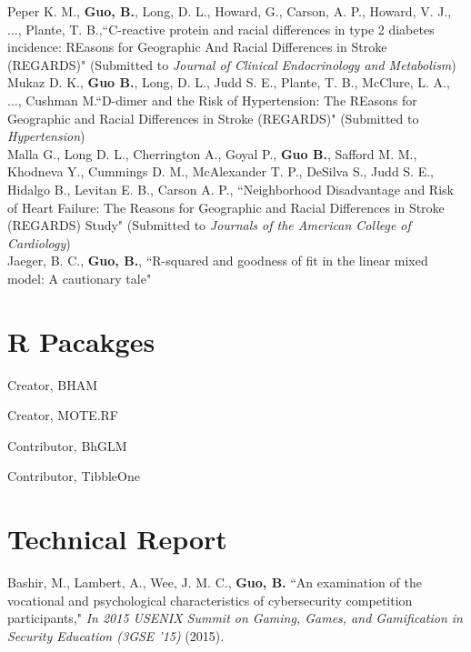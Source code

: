 Peper K. M., \textbf{Guo, B.}, Long, D. L., Howard, G., Carson, A. P., Howard, V. J., ..., Plante, T. B.,``C-reactive protein and racial differences in type 2 diabetes incidence: REasons for Geographic And Racial Differences in Stroke (REGARDS)" (Submitted to \textit{Journal of Clinical Endocrinology and Metabolism})\\

Mukaz D. K., \textbf{Guo B.}, Long, D. L., Judd S. E., Plante, T. B., McClure, L. A., ...,  Cushman M.``D-dimer and the Risk of Hypertension: The REasons for Geographic and Racial Differences in Stroke (REGARDS)" (Submitted to \textit{Hypertension})\\

Malla G., Long D. L., Cherrington A., Goyal P., \textbf{Guo B.}, Safford M. M., Khodneva Y., Cummings D. M., McAlexander T. P., DeSilva S., Judd S. E., Hidalgo B., Levitan E. B., Carson A. P., ``Neighborhood Disadvantage and Risk of Heart Failure: The Reasons for Geographic and Racial Differences in Stroke (REGARDS) Study" (Submitted to \textit{Journals of the American College of Cardiology})\\

Jaeger, B. C., \textbf{Guo, B.}, ``R-squared and goodness of fit in the linear mixed model: A cautionary tale"


\section{R Pacakges}
\begin{lonelist}
    \item Creator, BHAM
	\item Creator, MOTE.RF
	\item Contributor, BhGLM
	\item Contributor, TibbleOne
\end{lonelist}



\section{Technical Report}
Bashir, M., Lambert, A., Wee, J. M. C., \textbf{Guo, B.}  ``An examination of the vocational and psychological characteristics of cybersecurity competition participants," \textit{In 2015 USENIX Summit on Gaming, Games, and Gamification in Security Education (3GSE '15)} (2015).